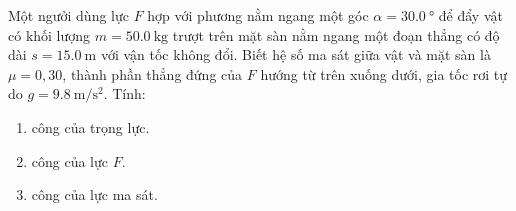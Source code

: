 \begin{ex}
	Một ngưởi dùng lực $F$ hợp với phương nằm ngang một góc $\alpha=\SI{30.0}{\degree}$ để đẩy vật có khối lượng $m=\SI{50.0}{\kilogram}$ trượt trên mặt sàn nằm ngang một đoạn thẳng có độ dài $s=\SI{15.0}{\meter}$ với vận tốc không đổi. Biết hệ số ma sát giữa vật và mặt sàn là $\mu=0,30$, thành phần thẳng đứng của $F$ hướng từ trên xuống dưới, gia tốc rơi tự do $g=\SI{9.8}{\meter/\second^2}$. Tính:
	\begin{enumerate}[label=\alph*)]
		\item công của trọng lực.
		\item công của lực $F$.
		\item công của lực ma sát.
	\end{enumerate}
\end{ex}
